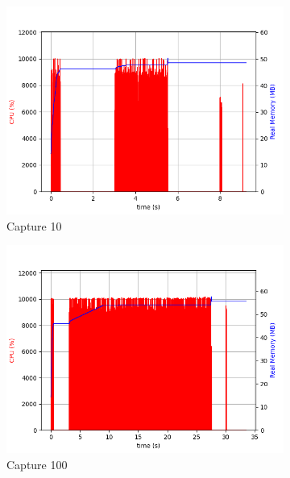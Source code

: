 \begin{figure}[ht!]
    \centering
    \begin{subfigure}[b]{0.45\textwidth}
        \centering
        \includegraphics[width=\textwidth]{abbildungen/10.png}
        \caption{Capture 10}
        \label{fig:cpu-10}
    \end{subfigure}
    \begin{subfigure}[b]{0.45\textwidth}
        \centering
        \includegraphics[width=\textwidth]{abbildungen/100.png}
        \caption{Capture 100}
        \label{fig:cpu-100}
    \end{subfigure}
    \begin{subfigure}[b]{\textwidth}
        \centering

\end{subfigure}
\end{figure}
